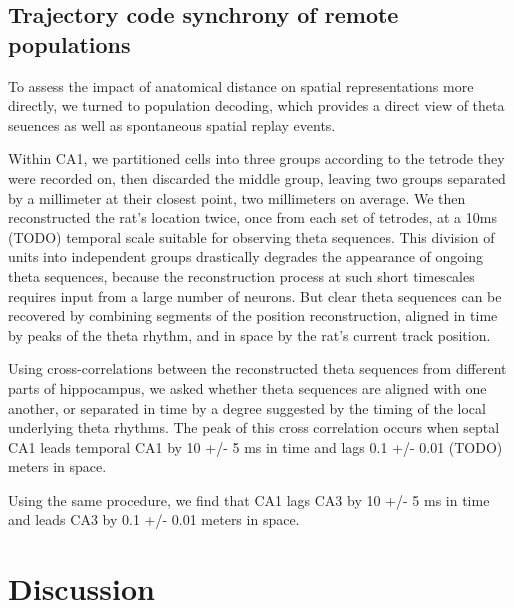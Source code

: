 \documentclass[10pt]{article}
\begin{document}
\subsection*{Trajectory code synchrony of remote populations}
To assess the impact of anatomical distance on spatial representations more directly, we turned to population decoding, which provides a direct view of theta seuences as well as spontaneous spatial replay events. 

Within CA1, we partitioned cells into three groups according to the tetrode they were recorded on, then discarded the middle group, leaving two groups separated by a millimeter at their closest point, two millimeters on average. We then reconstructed the rat's location twice, once from each set of tetrodes, at a 10ms (TODO) temporal scale suitable for observing theta sequences. This division of units into independent groups drastically degrades the appearance of ongoing theta sequences, because the reconstruction process at such short timescales requires input from a large number of neurons. But clear theta sequences can be recovered by combining segments of the position reconstruction, aligned in time by peaks of the theta rhythm, and in space by the rat's current track position.

Using cross-correlations between the reconstructed theta sequences from different parts of hippocampus, we asked whether theta sequences are aligned with one another, or separated in time by a degree suggested by the timing of the local underlying theta rhythms. The peak of this cross correlation occurs when septal CA1 leads temporal CA1 by 10 +/- 5 ms in time and lags 0.1 +/- 0.01 (TODO) meters in space.

Using the same procedure, we find that CA1 lags CA3 by 10 +/- 5 ms in time and leads CA3 by 0.1 +/- 0.01 meters in space.

\section*{Discussion}

\cite{Mizuseki 2012}


\end{document}
